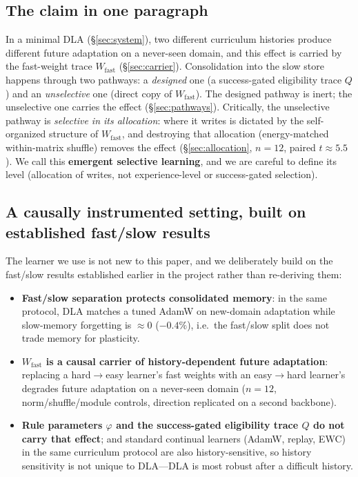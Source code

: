 \documentclass{article} %
\begin{document}
\subsection{The claim in one paragraph}

In a minimal DLA (\S\ref{sec:system}), two different curriculum histories produce different future adaptation on a never-seen domain, and this effect is carried by the fast-weight trace $W_{\mathrm{fast}}$ (\S\ref{sec:carrier}). Consolidation into the slow store happens through two pathways: a \emph{designed} one (a success-gated eligibility trace $Q$) and an \emph{unselective} one (direct copy of $W_{\mathrm{fast}}$). The designed pathway is inert; the unselective one carries the effect (\S\ref{sec:pathways}). Critically, the unselective pathway is \emph{selective in its allocation}: where it writes is dictated by the self-organized structure of $W_{\mathrm{fast}}$, and destroying that allocation (energy-matched within-matrix shuffle) removes the effect (\S\ref{sec:allocation}, $n{=}12$, paired $t\approx5.5$). We call this \textbf{emergent selective learning}, and we are careful to define its level (allocation of writes, not experience-level or success-gated selection).

\subsection{A causally instrumented setting, built on established fast/slow results}

The learner we use is not new to this paper, and we deliberately build on the fast/slow results established earlier in the project rather than re-deriving them:
\begin{itemize}
\item \textbf{Fast/slow separation protects consolidated memory}: in the same protocol, DLA matches a tuned AdamW on new-domain adaptation while slow-memory forgetting is $\approx$0 ($-0.4\%$), i.e.\ the fast/slow split does not trade memory for plasticity.
\item \textbf{$W_{\mathrm{fast}}$ is a causal carrier of history-dependent future adaptation}: replacing a hard$\to$easy learner's fast weights with an easy$\to$hard learner's degrades future adaptation on a never-seen domain ($n{=}12$, norm/shuffle/module controls, direction replicated on a second backbone).
\item \textbf{Rule parameters $\varphi$ and the success-gated eligibility trace $Q$ do not carry that effect}; and standard continual learners (AdamW, replay, EWC) in the same curriculum protocol are also history-sensitive, so history sensitivity is not unique to DLA---DLA is most robust after a difficult history.
\end{itemize}
\end{document}
